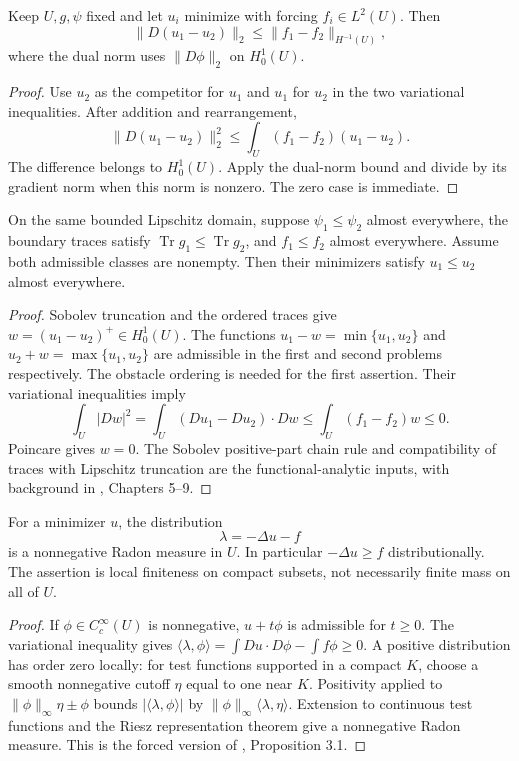 \begin{proposition}\label{prop:obstacle-forcing-stability}
Keep $U,g,\psi$ fixed and let $u_i$ minimize with forcing $f_i\in L^2(U)$. Then
\[
 \|D(u_1-u_2)\|_2\leq\|f_1-f_2\|_{H^{-1}(U)},
\]
where the dual norm uses $\|D\phi\|_2$ on $H^1_0(U)$.
\end{proposition}
\begin{proof}
Use $u_2$ as the competitor for $u_1$ and $u_1$ for $u_2$ in the two variational inequalities. After addition and rearrangement,
\[
 \|D(u_1-u_2)\|_2^2\leq\int_U(f_1-f_2)(u_1-u_2).
\]
The difference belongs to $H^1_0(U)$. Apply the dual-norm bound and divide by its gradient norm when this norm is nonzero. The zero case is immediate.
\end{proof}

\begin{proposition}\label{prop:obstacle-comparison}
On the same bounded Lipschitz domain, suppose $\psi_1\leq\psi_2$ almost everywhere, the boundary traces satisfy $\operatorname{Tr}g_1\leq\operatorname{Tr}g_2$, and $f_1\leq f_2$ almost everywhere. Assume both admissible classes are nonempty. Then their minimizers satisfy $u_1\leq u_2$ almost everywhere.
\end{proposition}
\begin{proof}
Sobolev truncation and the ordered traces give $w=(u_1-u_2)^+\in H^1_0(U)$. The functions $u_1-w=\min\{u_1,u_2\}$ and $u_2+w=\max\{u_1,u_2\}$ are admissible in the first and second problems respectively. The obstacle ordering is needed for the first assertion. Their variational inequalities imply
\[
 \int_U|Dw|^2
 =\int_U(Du_1-Du_2)\cdot Dw
 \leq\int_U(f_1-f_2)w\leq0.
\]
Poincare gives $w=0$. The Sobolev positive-part chain rule and compatibility of traces with Lipschitz truncation are the functional-analytic inputs, with background in \cite{SimonPDE}, Chapters 5--9.
\end{proof}

\begin{proposition}\label{prop:obstacle-reaction}
For a minimizer $u$, the distribution
\[
 \lambda=-\Delta u-f
\]
is a nonnegative Radon measure in $U$. In particular $-\Delta u\geq f$ distributionally. The assertion is local finiteness on compact subsets, not necessarily finite mass on all of $U$.
\end{proposition}
\begin{proof}
If $\phi\in C_c^\infty(U)$ is nonnegative, $u+t\phi$ is admissible for $t\geq0$. The variational inequality gives $\langle\lambda,\phi\rangle=\int Du\cdot D\phi-\int f\phi\geq0$. A positive distribution has order zero locally: for test functions supported in a compact $K$, choose a smooth nonnegative cutoff $\eta$ equal to one near $K$. Positivity applied to $\|\phi\|_\infty\eta\pm\phi$ bounds $|\langle\lambda,\phi\rangle|$ by $\|\phi\|_\infty\langle\lambda,\eta\rangle$. Extension to continuous test functions and the Riesz representation theorem give a nonnegative Radon measure. This is the forced version of \cite{Fig18}, Proposition 3.1.
\end{proof}

